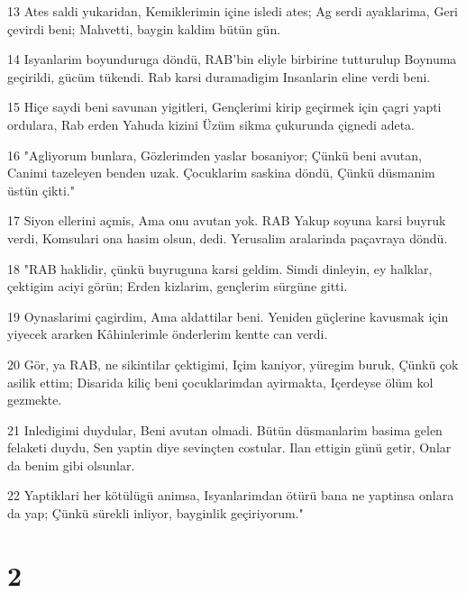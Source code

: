 \par 13 Ates saldi yukaridan, Kemiklerimin içine isledi ates; Ag serdi ayaklarima, Geri çevirdi beni; Mahvetti, baygin kaldim bütün gün.
\par 14 Isyanlarim boyunduruga döndü, RAB'bin eliyle birbirine tutturulup Boynuma geçirildi, gücüm tükendi. Rab karsi duramadigim Insanlarin eline verdi beni.
\par 15 Hiçe saydi beni savunan yigitleri, Gençlerimi kirip geçirmek için çagri yapti ordulara, Rab erden Yahuda kizini Üzüm sikma çukurunda çignedi adeta.
\par 16 "Agliyorum bunlara, Gözlerimden yaslar bosaniyor; Çünkü beni avutan, Canimi tazeleyen benden uzak. Çocuklarim saskina döndü, Çünkü düsmanim üstün çikti."
\par 17 Siyon ellerini açmis, Ama onu avutan yok. RAB Yakup soyuna karsi buyruk verdi, Komsulari ona hasim olsun, dedi. Yerusalim aralarinda paçavraya döndü.
\par 18 "RAB haklidir, çünkü buyruguna karsi geldim. Simdi dinleyin, ey halklar, çektigim aciyi görün; Erden kizlarim, gençlerim sürgüne gitti.
\par 19 Oynaslarimi çagirdim, Ama aldattilar beni. Yeniden güçlerine kavusmak için yiyecek ararken Kâhinlerimle önderlerim kentte can verdi.
\par 20 Gör, ya RAB, ne sikintilar çektigimi, Içim kaniyor, yüregim buruk, Çünkü çok asilik ettim; Disarida kiliç beni çocuklarimdan ayirmakta, Içerdeyse ölüm kol gezmekte.
\par 21 Inledigimi duydular, Beni avutan olmadi. Bütün düsmanlarim basima gelen felaketi duydu, Sen yaptin diye sevinçten costular. Ilan ettigin günü getir, Onlar da benim gibi olsunlar.
\par 22 Yaptiklari her kötülügü animsa, Isyanlarimdan ötürü bana ne yaptinsa onlara da yap; Çünkü sürekli inliyor, bayginlik geçiriyorum."

\chapter{2}

